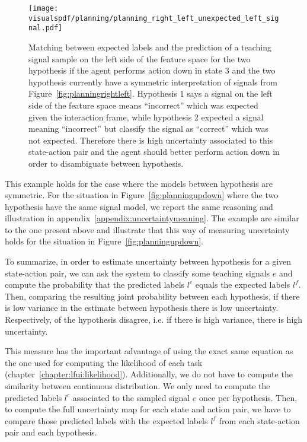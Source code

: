 \begin{figure}[!htbp]
  \centering
  \texttt{[image: \\visualspdf/planning/planning\_right\_left\_unexpected\_left\_signal.pdf]}
  \caption{Matching between expected labels and the prediction of a teaching signal sample on the left side of the feature space for the two hypothesis if the agent performs action down in state 3 and the two hypothesis currently have a symmetric interpretation of signals from Figure~\ref{fig:planningrightleft}. Hypothesis 1 says a signal on the left side of the feature space means ``incorrect'' which was expected given the interaction frame, while hypothesis 2 expected a signal meaning ``incorrect'' but classify the signal as ``correct'' which was not expected. Therefore there is high uncertainty associated to this state-action pair and the agent should better perform action down in order to disambiguate between hypothesis.}
  \label{fig:uncertaintymeaningrightleftunexpectedleft}
\end{figure}

This example holds for the case where the models between hypothesis are symmetric. For the situation in Figure~\ref{fig:planningupdown} where the two hypothesis have the same signal model, we report the same reasoning and illustration in appendix~\ref{appendix:uncertaintymeaning}. The example are similar to the one present above and illustrate that this way of measuring uncertainty holds for the situation in Figure~\ref{fig:planningupdown}.

To summarize, in order to estimate uncertainty between hypothesis for a given state-action pair, we can ask the system to classify some teaching signals $e$ and compute the probability that the predicted labels $l^c$ equals the expected labels $l^f$. Then, comparing the resulting joint probability between each hypothesis, if there is low variance in the estimate between hypothesis there is low uncertainty. Respectively, of the hypothesis disagree, i.e. if there is high variance, there is high uncertainty. 

This measure has the important advantage of using the exact same equation as the one used for computing the likelihood of each task (chapter~\ref{chapter:lfui:likelihood}). Additionally, we do not have to compute the similarity between continuous distribution. We only need to compute the predicted labels $l^c$ associated to the sampled signal $e$ once per hypothesis. Then, to compute the full uncertainty map for each state and action pair, we have to compare those predicted labels with the expected labels $l^f$ from each state-action pair and each hypothesis.

